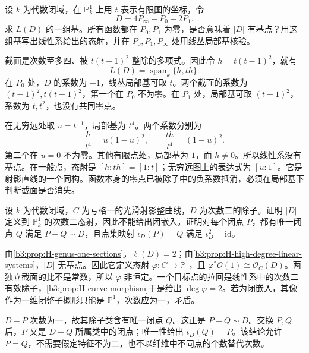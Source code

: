 \begin{exercise}\label{b3:ex:H-fixed-zeros-linear-system}
	设 \(k\) 为代数闭域，在 \(\mathbb P_k^1\) 上用 \(t\) 表示有限图的坐标，令
	\[
		D=4P_\infty-P_0-2P_1.
	\]
	求 \(L(D)\) 的一组基。所有函数都在 \(P_0,P_1\) 为零，是否意味着 \(|D|\) 有基点？用这组基写出线性系给出的态射，并在 \(P_0,P_1,P_\infty\) 处用线丛局部基核验。
\end{exercise}
\begin{solution}
	截面是次数至多四、被 \(t(t-1)^2\) 整除的多项式。因此令 \(h=t(t-1)^2\)，就有
	\[
		L(D)=\operatorname{span}_k\{h,th\}.
	\]
	在 \(P_0\) 处，\(D\) 的系数为 \(-1\)，线丛局部基可取 \(t\)。两个截面的系数为 \((t-1)^2,t(t-1)^2\)，第一个在 \(P_0\) 不为零。在 \(P_1\) 处，局部基可取 \((t-1)^2\)，系数为 \(t,t^2\)，也没有共同零点。

	在无穷远处取 \(u=t^{-1}\)，局部基为 \(t^4\)。两个系数分别为
	\[
		\frac{h}{t^4}=u(1-u)^2,\qquad
		\frac{th}{t^4}=(1-u)^2.
	\]
	第二个在 \(u=0\) 不为零。其他有限点处，局部基为 \(1\)，而 \(h\ne0\)。所以线性系没有基点。在一般点，态射是 \([h:th]=[1:t]\)；无穷远图上的表达式为 \([u:1]\)。它是射影直线的一个同构。函数本身的零点已被除子中的负系数抵消，必须在局部基下判断截面是否消失。
\end{solution}

\begin{exercise}\label{b3:ex:H-genus-one-degree-two}
	设 \(k\) 为代数闭域，\(C\) 为亏格一的光滑射影整曲线，\(D\) 为次数二的除子。证明 \(|D|\) 定义到 \(\mathbb P_k^1\) 的次数二态射，因此不能给出闭嵌入。证明对每个闭点 \(P\)，都有唯一闭点 \(Q\) 满足 \(P+Q\sim D\)，且点集映射 \(\iota_D(P)=Q\) 满足 \(\iota_D^2=\mathrm{id}\)。
\end{exercise}
\begin{solution}
	由\cref{b3:prop:H-genus-one-sections}，\(\ell(D)=2\)；由\cref{b3:prop:H-high-degree-linear-systems}，\(|D|\) 无基点。因此它定义态射 \(\varphi:C\rightarrow\mathbb P^1\)，且 \(\varphi^*\mathcal O(1)\cong\mathcal O_C(D)\)。两独立截面的比不是常数，所以 \(\varphi\) 非恒定。一个目标点的拉回是线性系中的次数二有效除子，\cref{b3:prop:H-curve-morphism}于是给出 \(\deg\varphi=2\)。若为闭嵌入，其像作为一维闭整子概形只能是 \(\mathbb P^1\)，次数应为一，矛盾。

	\(D-P\) 次数为一，故其除子类含有唯一闭点 \(Q\)。这正是 \(P+Q\sim D\)。交换 \(P,Q\) 后，\(P\) 又是 \(D-Q\) 所属类中的闭点；唯一性给出 \(\iota_D(Q)=P\)。该结论允许 \(P=Q\)，不需要假定特征不为二，也不以纤维中不同点的个数替代次数。
\end{solution}

